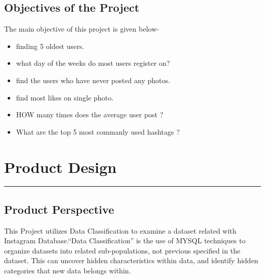 \section{Objectives of the Project }
The main objective of this project is given below-
\begin{itemize}
	\item finding 5 oldest users.
	\item what day of the weeks do most users register on?
    \item find the users who have never posted any photos.
    \item find most likes on single photo.
	\item HOW many times does the average user post ?
	\item What are the top 5 most commanly used hashtags ?

	
\end{itemize}




\chapter{Product Design}\hrule
\label{Chapter:3}

\section{Product Perspective}
This Project utilizes Data Classification to examine a dataset related with Instagram Database.“Data Classification” is the use of MYSQL techniques to organize datasets into related sub-populations, not previous specified in the dataset. This can uncover hidden characteristics within data, and identify hidden categories that new data belongs within.
